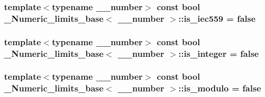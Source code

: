 \subsubsection[{is\+\_\+iec559}]{\setlength{\rightskip}{0pt plus 5cm}template$<$typename \+\_\+\+\_\+number$>$ const {\bf bool} {\bf \+\_\+\+Numeric\+\_\+limits\+\_\+base}$<$ \+\_\+\+\_\+number $>$\+::is\+\_\+iec559 = {\bf false}\hspace{0.3cm}{\ttfamily [static]}}\label{class__Numeric__limits__base_a840e40576b7fffa76b4f5776f8a7a4f1}
\hypertarget{class__Numeric__limits__base_a5b4c871c8036c4e2b130820e586de6c3}{}
\subsubsection[{is\+\_\+integer}]{\setlength{\rightskip}{0pt plus 5cm}template$<$typename \+\_\+\+\_\+number$>$ const {\bf bool} {\bf \+\_\+\+Numeric\+\_\+limits\+\_\+base}$<$ \+\_\+\+\_\+number $>$\+::is\+\_\+integer = {\bf false}\hspace{0.3cm}{\ttfamily [static]}}\label{class__Numeric__limits__base_a5b4c871c8036c4e2b130820e586de6c3}
\hypertarget{class__Numeric__limits__base_a30c9455262bca36bd81bb19416b5c3c9}{}
\subsubsection[{is\+\_\+modulo}]{\setlength{\rightskip}{0pt plus 5cm}template$<$typename \+\_\+\+\_\+number$>$ const {\bf bool} {\bf \+\_\+\+Numeric\+\_\+limits\+\_\+base}$<$ \+\_\+\+\_\+number $>$\+::is\+\_\+modulo = {\bf false}\hspace{0.3cm}{\ttfamily [static]}}\label{class__Numeric__limits__base_a30c9455262bca36bd81bb19416b5c3c9}
\hypertarget{class__Numeric__limits__base_a8ec6556a2cfa7db8922c44806de5fc16}{}
